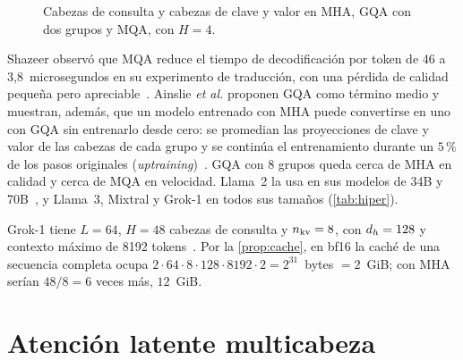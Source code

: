 \begin{figure}[ht]
\centering
{}
\caption{Cabezas de consulta y cabezas de clave y valor en MHA, GQA con dos grupos y MQA, con $H=4$.}
\label{fig:gqa}
\end{figure}

Shazeer observó que MQA reduce el tiempo de decodificación por token de 46 a 3,8~microsegundos en su experimento de traducción, con una pérdida de calidad pequeña pero apreciable~\cite[§4.2 y §4.3]{mqa}. Ainslie \emph{et al.} proponen GQA como término medio y muestran, además, que un modelo entrenado con MHA puede convertirse en uno con GQA sin entrenarlo desde cero: se promedian las proyecciones de clave y valor de las cabezas de cada grupo y se continúa el entrenamiento durante un $5\,\%$ de los pasos originales (\emph{uptraining})~\cite[§2.1 y §3.1]{gqa}. GQA con 8 grupos queda cerca de MHA en calidad y cerca de MQA en velocidad. Llama~2 la usa en sus modelos de 34B y 70B~\cite[tabla~1]{llama2}, y Llama~3, Mixtral y Grok-1 en todos sus tamaños (\cref{tab:hiper}).

\begin{ejemplo}[Grok-1]\label{ej:grokkv}
Grok-1 tiene $L=64$, $H=48$ cabezas de consulta y $n_{\mathrm{kv}}=8$, con $d_{h}=128$ y contexto máximo de 8192 tokens~\cite{grok1}. Por la \cref{prop:cache}, en bf16 la caché de una secuencia completa ocupa $2\cdot 64\cdot 8\cdot 128\cdot 8192\cdot 2=2^{31}$~bytes $=2$~GiB; con MHA serían $48/8=6$ veces más, $12$~GiB.
\end{ejemplo}

\section{Atención latente multicabeza}


